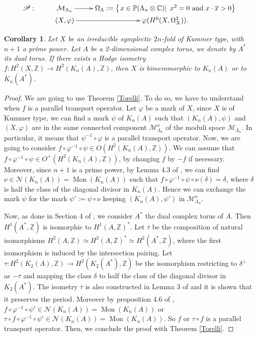 \documentclass{alggeom}
\DeclareMathOperator{\Mon}{Mon}
\newcommand{\C}{\mathbb{C}}
\newcommand{\Z}{\mathbb{Z}}
\theoremstyle{plain}
\newtheorem{cor}[theorem]{Corollary}
\theoremstyle{definition}
\theoremstyle{remark}
\begin{document}
$$\xymatrix@R0pt{
\mathscr{P}:& \mathcal{M}_{\Lambda_n}\ar[r] & \Omega_{\Lambda}:=\left\{\left.x\in\mathbb{P}(\Lambda_n\otimes\C)\right|\ x^2=0\ \text{and}\ x\cdot\overline{x}>0\right\}\\
&(X,\varphi)   \ar[r] & \varphi(H^{0}(X,\Omega_X^2)).
   }$$
\begin{cor}\label{Torellicoro}
Let $X$ be an irreducible symplectic $2n$-fold of Kummer type, with $n+1$ a prime power. Let $A$ be a 2-dimensional complex torus, we denote by $A^*$ its dual torus.
If there exists a Hodge isometry $f : H^2(X,\Z) \to H^2(K_n(A),\Z)$, then $X$ is bimeromorphic to $K_n(A)$ or to $K_n(A^*)$.
\end{cor}
\begin{proof}
We are going to use Theorem \ref{Torelli}. To do so, we have to understand when $f$ is a parallel transport operator.
Let $\varphi$ be a mark of $X$, since $X$ is of Kummer type, we can find a mark $\psi$ of $K_n(A)$ such that $(K_n(A),\psi)$ and $(X,\varphi)$ are in the same connected component $\mathcal{M}_{\Lambda_n}^o$ of the moduli space $\mathcal{M}_{\Lambda_n}$. In particular, it means that $\psi^{-1}\circ\varphi $ is a parallel transport operator. Now, we are going to consider $f\circ\varphi^{-1}\circ \psi\in O(H^2(K_n(A),\Z))$. We can assume that $f\circ\varphi^{-1}\circ \psi\in O^+(H^2(K_n(A),\Z))$, by changing $f$ by $-f$ if necessary.
Moreover, since $n+1$ is a prime power, by Lemma 4.3 of \cite{Markmanou}, we can find $\nu\in \mathcal{N}(K_n(A))=\Mon(K_n(A))$ such that $f\circ\varphi^{-1}\circ \psi\circ\nu(\delta)=\delta$, where $\delta$ is half the class of the diagonal divisor in $K_n(A)$. Hence we can exchange the mark $\psi$ for the mark $\psi':=\psi\circ\nu$ keeping $(K_n(A),\psi')$ in $\mathcal{M}_{\Lambda_n}^o$.


Now, as done in Section 4 of \cite{Markmanou}, we consider $A^*$ the dual complex torus of $A$. Then $H^1(A^*,\Z)$ is isomorphic to $H^1(A,\Z)^*$. Let $\overline{\tau}$ be the composition of natural isomorphisms $H^2(A,\Z)\simeq H^2(A,\Z)^*\simeq H^2(A^*,\Z)$, where the first isomorphism is induced by the intersection pairing. Let $\tau: H^2(K_2(A),\Z)\rightarrow H^2(K_2(A^*),\Z)$ be the isomorphism restricting to $\delta^\bot$ as $-\overline{\tau}$ and mapping the class $\delta$ to half the class of the diagonal divisor in $K_2(A^*)$. The isometry $\overline{\tau}$ is also constructed in Lemma 3 of \cite{Shioda} and it is shown that it preserves the period. Moreover by proposition 4.6 of \cite{Markmanou}, 
$f\circ\varphi^{-1}\circ \psi'\in \mathcal{N}(K_n(A))=\Mon(K_n(A))$ or $\tau\circ f\circ\varphi^{-1}\circ \psi'\in \mathcal{N}(K_n(A))=\Mon(K_n(A))$. So $f$ or $\tau\circ f$ is a parallel transport operator. Then, we conclude the proof with Theorem \ref{Torelli}.
\end{proof}
\end{document}
